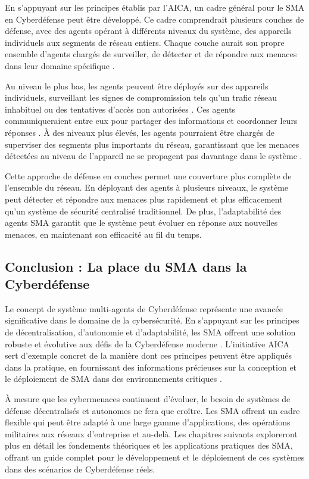 En s'appuyant sur les principes établis par l'AICA, un cadre général pour le SMA en Cyberdéfense peut être développé. Ce cadre comprendrait plusieurs couches de défense, avec des agents opérant à différents niveaux du système, des appareils individuels aux segments de réseau entiers. Chaque couche aurait son propre ensemble d'agents chargés de surveiller, de détecter et de répondre aux menaces dans leur domaine spécifique \cite{bou-harb2017cyber}.

Au niveau le plus bas, les agents peuvent être déployés sur des appareils individuels, surveillant les signes de compromission tels qu'un trafic réseau inhabituel ou des tentatives d'accès non autorisées \cite{kolias2011swarm}. Ces agents communiqueraient entre eux pour partager des informations et coordonner leurs réponses \cite{shamshirband2018computational}. À des niveaux plus élevés, les agents pourraient être chargés de superviser des segments plus importants du réseau, garantissant que les menaces détectées au niveau de l'appareil ne se propagent pas davantage dans le système \cite{hu2018mimic}.

Cette approche de défense en couches permet une couverture plus complète de l'ensemble du réseau. En déployant des agents à plusieurs niveaux, le système peut détecter et répondre aux menaces plus rapidement et plus efficacement qu'un système de sécurité centralisé traditionnel. De plus, l'adaptabilité des agents SMA garantit que le système peut évoluer en réponse aux nouvelles menaces, en maintenant son efficacité au fil du temps.

\subsection{Conclusion : La place du SMA dans la Cyberdéfense}

Le concept de système multi-agents de Cyberdéfense représente une avancée significative dans le domaine de la cybersécurité. En s'appuyant sur les principes de décentralisation, d'autonomie et d'adaptabilité, les SMA offrent une solution robuste et évolutive aux défis de la Cyberdéfense moderne \cite{kolias2011swarm}. L'initiative AICA sert d'exemple concret de la manière dont ces principes peuvent être appliqués dans la pratique, en fournissant des informations précieuses sur la conception et le déploiement de SMA dans des environnements critiques \cite{bou-harb2014cyber}.

À mesure que les cybermenaces continuent d'évoluer, le besoin de systèmes de défense décentralisés et autonomes ne fera que croître. Les SMA offrent un cadre flexible qui peut être adapté à une large gamme d'applications, des opérations militaires aux réseaux d'entreprise et au-delà. Les chapitres suivants exploreront plus en détail les fondements théoriques et les applications pratiques des SMA, offrant un guide complet pour le développement et le déploiement de ces systèmes dans des scénarios de Cyberdéfense réels.


